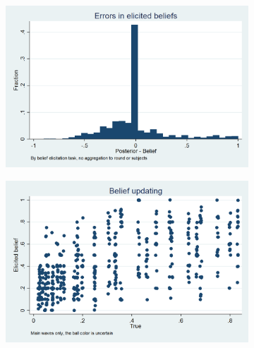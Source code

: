 \documentclass[11pt,a4paper]{article}
\begin{document}
\begin{figure}[H]
\centering
\caption{Belief Updating}
\begin{subfigure}[t]{.48\textwidth}
  \centering
  \includegraphics[width=\textwidth]{Graphs/hist_belief_error.png}
\end{subfigure}
\begin{subfigure}[t]{.48\textwidth}
  \centering
  \includegraphics[width=\textwidth]{Graphs/updating_s4.png}

\end{subfigure}

\end{figure}
\end{document}

